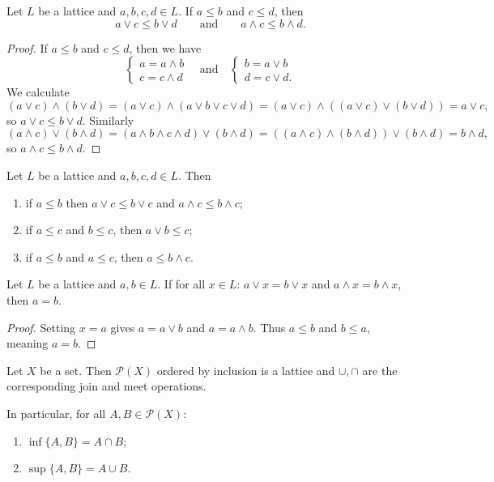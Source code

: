 \begin{lemma} \label{lemma:orderLattice}
Let $L$ be a lattice and $a,b,c,d\in L$. If $a\leq b$ and $c\leq d$, then
\[ a\vee c\leq b\vee d \qquad\text{and}\qquad a\wedge c \leq b\wedge d. \]
\end{lemma}
\begin{proof}
If $a\leq b$ and $c\leq d$, then we have
\[ \begin{cases}
a = a\wedge b \\ c = c\wedge d
\end{cases} \quad \text{and} \quad \begin{cases}
b = a\vee b \\ d = c\vee d.
\end{cases}\]
We calculate
\[ (a\vee c)\wedge (b\vee d) = (a\vee c)\wedge (a\vee b\vee c\vee d) = (a\vee c)\wedge ((a\vee c)\vee (b\vee d)) = a\vee c, \]
so $a\vee c\leq b\vee d$.
Similarly
\[ (a\wedge c)\vee (b\wedge d) = (a\wedge b\wedge c\wedge d)\vee (b\wedge d) = ((a\wedge c)\wedge (b\wedge d))\vee (b\wedge d) = b\wedge d, \]
so $a\wedge c \leq b\wedge d$.
\end{proof}
\begin{corollary} \label{corollary:orderLattice}
Let $L$ be a lattice and $a,b,c,d\in L$. Then
\begin{enumerate}
\item if $a\leq b$ then $a\vee c \leq b \vee c$ and $a\wedge c \leq b\wedge c$;
\item if $a\leq c$ and $b\leq c$, then $a\vee b \leq c$;
\item if $a\leq b$ and $a\leq c$, then $a\leq b\wedge c$.
\end{enumerate}
\end{corollary}

\begin{lemma} \label{lemma:cancellationGeneralLattices}
Let $L$ be a lattice and $a,b\in L$. If for all $x\in L$: $a\vee x = b\vee x$ and $a\wedge x = b\wedge x$, then $a = b$.
\end{lemma}
\begin{proof}
Setting $x = a$ gives $a = a\vee b$ and $a = a\wedge b$. Thus $a \leq b$ and $b \leq a$, meaning $a = b$.
\end{proof}

\begin{lemma}
Let $X$ be a set. Then $\mathcal{P}(X)$ ordered by inclusion is a lattice and $\cup, \cap$ are the corresponding join and meet operations.

In particular, for all $A,B\in \mathcal{P}(X)$:
\begin{enumerate}
\item $\inf\{A,B\} = A\cap B$;
\item $\sup\{A,B\} = A\cup B$.
\end{enumerate}
\end{lemma}

